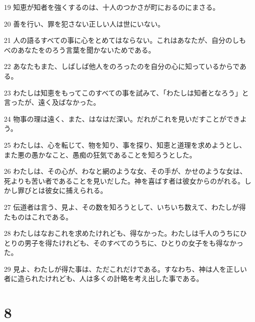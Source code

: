 \par 19 知恵が知者を強くするのは、十人のつかさが町におるのにまさる。
\par 20 善を行い、罪を犯さない正しい人は世にいない。
\par 21 人の語るすべての事に心をとめてはならない。これはあなたが、自分のしもべのあなたをのろう言葉を聞かないためである。
\par 22 あなたもまた、しばしば他人をのろったのを自分の心に知っているからである。
\par 23 わたしは知恵をもってこのすべての事を試みて、「わたしは知者となろう」と言ったが、遠く及ばなかった。
\par 24 物事の理は遠く、また、はなはだ深い。だれがこれを見いだすことができよう。
\par 25 わたしは、心を転じて、物を知り、事を探り、知恵と道理を求めようとし、また悪の愚かなこと、愚痴の狂気であることを知ろうとした。
\par 26 わたしは、その心が、わなと網のような女、その手が、かせのような女は、死よりも苦い者であることを見いだした。神を喜ばす者は彼女からのがれる。しかし罪びとは彼女に捕えられる。
\par 27 伝道者は言う、見よ、その数を知ろうとして、いちいち数えて、わたしが得たものはこれである。
\par 28 わたしはなおこれを求めたけれども、得なかった。わたしは千人のうちにひとりの男子を得たけれども、そのすべてのうちに、ひとりの女子をも得なかった。
\par 29 見よ、わたしが得た事は、ただこれだけである。すなわち、神は人を正しい者に造られたけれども、人は多くの計略を考え出した事である。

\chapter{8}

